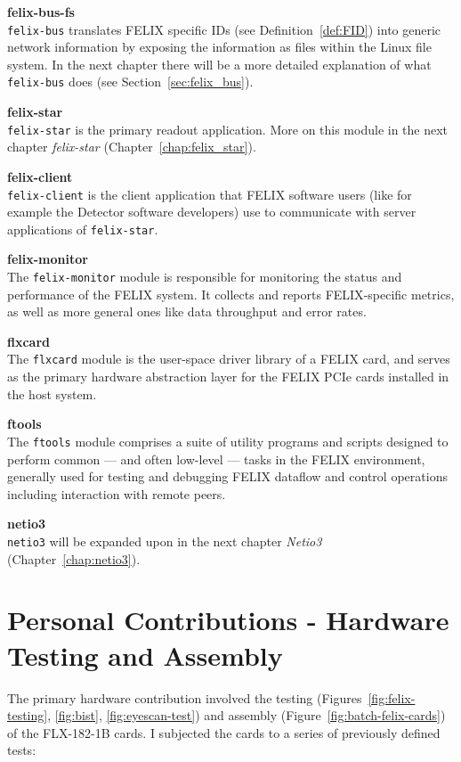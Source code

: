 \textbf{felix-bus-fs}\\
\texttt{felix-bus} translates \acs{FELIX} specific IDs (see Definition~\ref{def:FID}) into generic network information by exposing the information as files within the Linux file system. In the next chapter there will be a more detailed explanation of what \texttt{felix-bus} does (see Section~\ref{sec:felix_bus}).

\textbf{felix-star}\\
\texttt{felix-star} is the primary readout application. More on this module in the next chapter \emph{felix-star} (Chapter~\ref{chap:felix_star}).

\textbf{felix-client}\\
\texttt{felix-client} is the client application that \acs{FELIX} software users (like for example the Detector software developers) use to communicate with server applications of \texttt{felix-star}.

\textbf{felix-monitor}\\
The \texttt{felix-monitor} module is responsible for monitoring the status and performance of the \acs{FELIX} system. It collects and reports \acs{FELIX}-specific metrics, as well as more general ones like data throughput and error rates.

\textbf{flxcard}\\
The \texttt{flxcard} module is the user-space driver library of a \acs{FELIX card}, and serves as the primary hardware abstraction layer for the \acs{FELIX} \acs{PCIe} cards installed in the host system.

\textbf{ftools}\\
The \texttt{ftools} module comprises a suite of utility programs and scripts designed to perform common --- and often low-level --- tasks in the \acs{FELIX} environment, generally used for testing and debugging \acs{FELIX} dataflow and control operations including interaction with remote peers.

\textbf{netio3}\\
\texttt{netio3} will be expanded upon in the next chapter \emph{Netio3} (Chapter~\ref{chap:netio3}).

\clearpage
\section{Personal Contributions - Hardware Testing and Assembly}
\label{sec:felix-hardware-contributions}

The primary hardware contribution involved the testing (Figures~\ref{fig:felix-testing}, \ref{fig:bist}, \ref{fig:eyescan-test}) and assembly (Figure~\ref{fig:batch-felix-cards}) of the FLX-182-1B cards. I subjected the cards to a series of previously defined tests:


